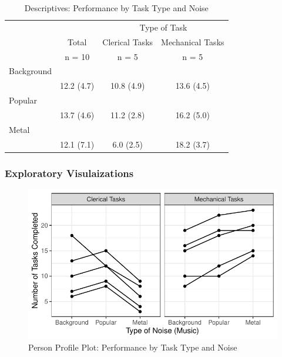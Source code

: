 \documentclass[
]{article}
\begin{document}
\begin{table}[ ht ] 
\centering 
\caption{Descriptives: Performance by Task Type and Noise}\label{}
\begin{tabular}{ l c c c }
\toprule
 &   &  \multicolumn{ 2 }{c}{ Type of Task }\\ 
  & Total & Clerical Tasks & Mechanical Tasks \\ 
 & n = 10 & n = 5 & n = 5 \\ 
 \midrule
Background &   &   &  \\ 
\hspace{6pt}   & 12.2 (4.7) & 10.8 (4.9) & 13.6 (4.5)\\ 
Popular &   &   &  \\ 
\hspace{6pt}   & 13.7 (4.6) & 11.2 (2.8) & 16.2 (5.0)\\ 
Metal &   &   &  \\ 
\hspace{6pt}   & 12.1 (7.1) & 6.0 (2.5) & 18.2 (3.7)\\ 
\bottomrule

\end{tabular}
\end{table}

\clearpage

\hypertarget{exploratory-visulaizations}{%
\subsubsection{Exploratory
Visulaizations}\label{exploratory-visulaizations}}

\begin{figure}

{\centering \includegraphics{Chapter-16-Assignment-R-Skeleton_files/figure-latex/unnamed-chunk-4-1} 

}

\caption{Person Profile Plot: Performance by Task Type and Noise}\label{fig:unnamed-chunk-4}
\end{figure}
\end{document}
